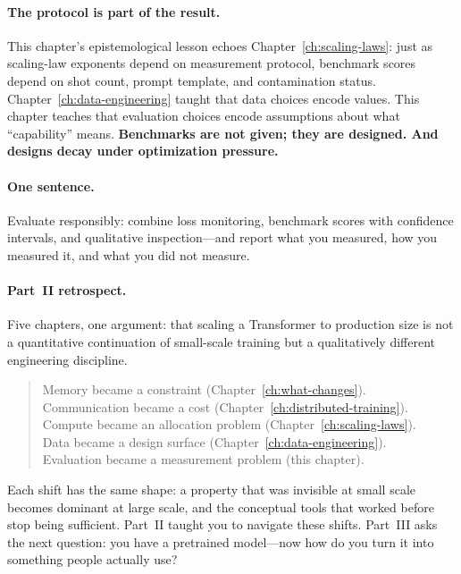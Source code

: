 \paragraph{The protocol is part of the result.} This chapter's epistemological lesson echoes Chapter~\ref{ch:scaling-laws}: just as scaling-law exponents depend on measurement protocol, benchmark scores depend on shot count, prompt template, and contamination status. Chapter~\ref{ch:data-engineering} taught that data choices encode values. This chapter teaches that evaluation choices encode assumptions about what ``capability'' means. \textbf{Benchmarks are not given; they are designed. And designs decay under optimization pressure.}

\paragraph{One sentence.} Evaluate responsibly: combine loss monitoring, benchmark scores with confidence intervals, and qualitative inspection---and report what you measured, how you measured it, and what you did not measure.

\paragraph{Part~II retrospect.} Five chapters, one argument: that scaling a Transformer to production size is not a quantitative continuation of small-scale training but a qualitatively different engineering discipline.

\begin{quote}
Memory became a constraint (Chapter~\ref{ch:what-changes}).\\
Communication became a cost (Chapter~\ref{ch:distributed-training}).\\
Compute became an allocation problem (Chapter~\ref{ch:scaling-laws}).\\
Data became a design surface (Chapter~\ref{ch:data-engineering}).\\
Evaluation became a measurement problem (this chapter).
\end{quote}

Each shift has the same shape: a property that was invisible at small scale becomes dominant at large scale, and the conceptual tools that worked before stop being sufficient. Part~II taught you to navigate these shifts. Part~III asks the next question: you have a pretrained model---now how do you turn it into something people actually use?

